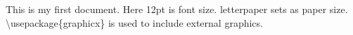 \documentclass[12pt, letterpaper]{article}
\begin{document}
	This is my first document.
	Here 12pt is font size.
	letterpaper sets as paper size.
	\textbackslash usepackage\{graphicx\} is used to include external graphics.
\end{document}
